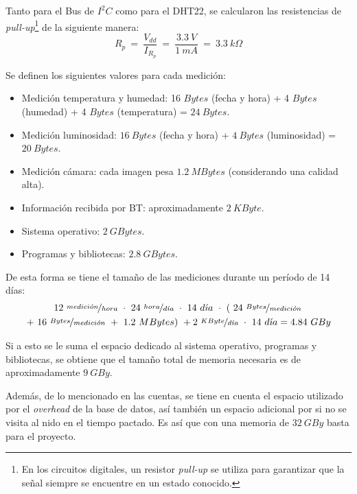 Tanto para el Bus de $I^2C$ como para el DHT22, se calcularon las resistencias de \textit{pull-up}\footnote{En los circuitos digitales, un resistor \textit{pull-up} se utiliza para garantizar que la señal siempre se encuentre en un estado conocido.} de la siguiente manera:
\begin{equation}
	R_p \ = \  \frac{V_{dd}}{I_{R_p}} \ = \ \frac{3.3 \ V}{1 \ mA} \ = \ 3.3 \ k\Omega  
\end{equation}

Se definen los siguientes valores para cada medición:
\begin{itemize}
	\item Medición temperatura y humedad: 16 $Bytes$ (fecha y hora) + 4 $Bytes$ (humedad) + 4 $Bytes$ (temperatura) = $24 \ Bytes$.
	\item Medición luminosidad: $16 \ Bytes$ (fecha y hora) + $4 \ Bytes$ (luminosidad) = $20 \ Bytes$.
	\item Medición cámara: cada imagen pesa $1.2 \ MBytes$ \cite{ref:rpicam} (considerando una calidad alta).
	\item Información recibida por BT: aproximadamente $2 \ KByte$.
	\item Sistema operativo: $2 \ GBytes$.
	\item Programas y bibliotecas: $2.8 \ GBytes$.
\end{itemize}

De esta forma se tiene el tamaño de las mediciones durante un período de 14 días:
\begin{multline*}
	12 \ \nicefrac{medici\acute{o}n}{hora} \  \cdot \ 24 \ \nicefrac{hora}{d\acute{\imath}a} \  \cdot \ 14 \ d\acute{\imath}a \  \cdot \ \left( \ 24 \  \nicefrac{Bytes}{medici\acute{o}n} \right. \\ \left. + \ 16 \ \nicefrac{Bytes}{medici\acute{o}n} \ + \ 1.2 \ MBytes \right) \ + 2 \ \nicefrac{KByte}{d\acute{\imath}a} \  \cdot \  14 \ d\acute{\imath}a = 4.84 \ GBy
\end{multline*}

Si a esto se le suma el espacio dedicado al sistema operativo, programas y bibliotecas, se obtiene que el tamaño total de memoria necesaria es de aproximadamente $9 \ GBy$.

Además, de lo mencionado en las cuentas, se tiene en cuenta el espacio utilizado por el \textit{overhead} de la base de datos, así también un espacio adicional por si no se visita al nido en el tiempo pactado. Es así que con una memoria de $32 \ GBy$ basta para el proyecto.